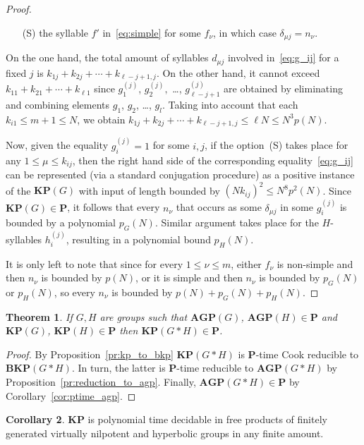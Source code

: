 \documentclass[10pt]{amsart}
\newtheorem{theorem}{Theorem}[section]
\theoremstyle{definition}
\newtheorem{corollary}[theorem]{Corollary}
\def\P{{\mathbf{P}}}
\def\BKP{{\mathbf{BKP}}}
\def\KP{{\mathbf{KP}}}
\def\AGP{{\mathbf{AGP}}}
\begin{document}
\begin{proof}
\begin{itemize}
\item[(S)]\label{li:simple} the syllable $f'$ in~\eqref{eq:simple} for some $f_\nu$, in which case $\delta_{\mu j}=n_\nu$.
\end{itemize}
On the one hand, the total amount of syllables $d_{\mu j}$ involved in~\eqref{eq:g_ij} for a fixed $j$ is $k_{1j}+k_{2j}+\cdots +k_{\ell-j+1,j}$. On the other hand, it cannot exceed $k_{11}+k_{21}+\cdots +k_{\ell 1}$
since $g_1^{(j)}$, $g_2^{(j)},$ \ldots, $g_{\ell-j+1}^{(j)}$ are obtained by eliminating and combining elements $g_1$, $g_2$, \ldots, $g_l$. Taking into account that each $k_{i1}\le m+1\le N$, we obtain $k_{1j}+k_{2j}+\cdots +k_{\ell-j+1,j}\le \ell N\le N^3p(N)$.



Now, given the equality $g_i^{(j)}=1$ for some $i,j$, if the option~(S) takes place for any $1\le \mu\le k_{ij}$, then the right hand side of the corresponding equality~\eqref{eq:g_ij} can be represented (via a standard conjugation procedure) as a positive instance of the $\KP(G)$ with input of length bounded by $(N k_{ij})^2\le N^8p^2(N)$. Since $\KP(G)\in\P$, it follows that every $n_\nu$ that occurs as some $\delta_{\mu j}$ in some $g_i^{(j)}$ is bounded by a polynomial $p_G(N)$. Similar argument takes place for the $H$-syllables $h_i^{(j)}$, resulting in a polynomial bound $p_H(N)$.

It is only left to note that since for every $1\le \nu\le m$, either $f_\nu$ is non-simple and then $n_\nu$ is bounded by $p(N)$, or it is simple and then $n_\nu$ is bounded by $p_G(N)$ or $p_H(N)$, so every $n_\nu$ is bounded by $p(N)+p_G(N)+p_H(N)$.
\end{proof}

\begin{theorem}\label{th:ptime_kp}
If $G,H$ are groups such that $\AGP(G)$, $\AGP(H)\in\P$ and $\KP(G)$, $\KP(H)\in\P$ then $\KP(G*H)\in\P$.
\end{theorem}
\begin{proof} By Proposition~\ref{pr:kp_to_bkp} $\KP(G*H)$ is $\P$-time Cook reducible to $\BKP(G*H)$. In turn, the latter is $\P$-time reducible to $\AGP(G*H)$ by Proposition~\ref{pr:reduction_to_agp}. Finally, $\AGP(G*H)\in\P$ by Corollary~\ref{cor:ptime_agp}. 
\end{proof}
\begin{corollary}
$\KP$ is polynomial time decidable in free products of finitely generated virtually nilpotent and hyperbolic groups in any finite amount.
\end{corollary}

%

\end{document}
